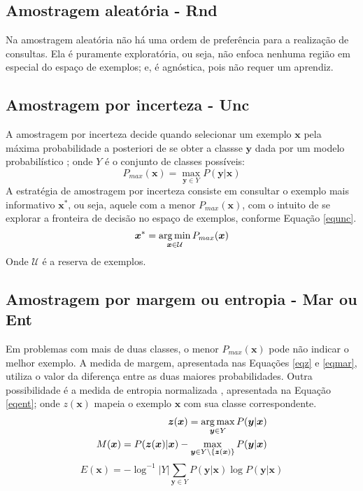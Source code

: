 \subsection{Amostragem aleatória - Rnd}
Na amostragem aleatória não há uma ordem de preferência para a realização de
consultas.
Ela é puramente exploratória, ou seja,
não enfoca nenhuma região em especial do espaço de exemplos; e,
é agnóstica, pois não requer um aprendiz.

\subsection{Amostragem por incerteza - Unc}\label{unc}
A amostragem por incerteza decide quando selecionar um exemplo $\bm{x}$
pela máxima probabilidade a posteriori de se obter a classse $\bm{y}$
dada por um modelo probabilístico \citep{journals/sigir/Lewis95a};
onde $Y$ é o conjunto de classes possíveis:
\begin{equation}
P_{max}(\bm{x})=\max_{\bm{y}\in Y}P(\bm{y}|\bm{x})
\end{equation}
A estratégia de amostragem por incerteza consiste em consultar o exemplo
mais informativo $\bm{x}^*$,
ou seja, aquele com a menor $P_{max}(\bm{x})$,
com o intuito de se explorar a fronteira de decisão no espaço de exemplos, conforme
Equação \ref{equnc}.
\begin{equation} \label{equnc}
 \bm{x}^*= \operatorname*{arg\,min}_{\bm{x}\in\mathcal{U}}P_{max}(\bm{x})
\end{equation}
Onde $\mathcal{U}$ é a reserva de exemplos.

\subsection{Amostragem por margem ou entropia - Mar ou Ent}\label{mar}
Em problemas com mais de duas classes,
o menor $P_{max}(\bm{x})$ pode não indicar o melhor exemplo.
A medida de margem, apresentada nas Equações \ref{eqz} e \ref{eqmar},
utiliza o valor da diferença entre as duas maiores probabilidades.
Outra possibilidade é a medida de entropia normalizada
\citep{journals/bioinformatics/LewinSA0P04}, apresentada na Equação \ref{eqent};
onde $z(\bm{x})$ mapeia o exemplo $\bm{x}$ com sua classe correspondente.
\begin{eqnarray} \label{eqz}
\bm{z}(\bm{x})=\operatorname*{arg\,max}_{\bm{y}\in Y}P(\bm{y}|\bm{x})
\\
M(\bm{x})=P(\bm{z}(\bm{x})|\bm{x})-\max_{\bm{y}\in Y\setminus\{\bm{z}(\bm{x})\}}P(\bm{y}|\bm{x})
\label{eqmar}
\end{eqnarray}
\begin{equation} \label{eqent}
E(\bm{x})=-\log^{-1}|Y|\sum_{\bm{y}\in Y}P(\bm{y}|\bm{x})\log P(\bm{y}|\bm{x})
\end{equation}

